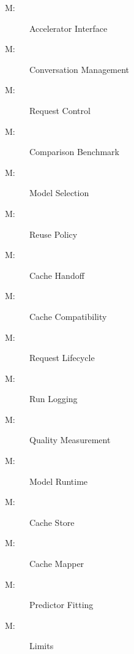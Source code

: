 \documentclass[12pt, titlepage]{article}
\newcounter{mnum}
\newcommand{\mthemnum}{M\themnum}
\begin{document}
\begin{description}
\item [ \mthemnum \label{mAccel}:] Accelerator Interface
\item [ \mthemnum \label{mConv}:] Conversation Management
\item [ \mthemnum \label{mCtrl}:] Request Control
\item [ \mthemnum \label{mBench}:] Comparison Benchmark
\item [ \mthemnum \label{mSelect}:] Model Selection
\item [ \mthemnum \label{mReuse}:] Reuse Policy
\item [ \mthemnum \label{mHandoff}:] Cache Handoff
\item [ \mthemnum \label{mCompat}:] Cache Compatibility
\item [ \mthemnum \label{mLife}:] Request Lifecycle
\item [ \mthemnum \label{mLog}:] Run Logging
\item [ \mthemnum \label{mQuality}:] Quality Measurement
\item [ \mthemnum \label{mModelRun}:] Model Runtime
\item [ \mthemnum \label{mCache}:] Cache Store
\item [ \mthemnum \label{mMap}:] Cache Mapper
\item [ \mthemnum \label{mFit}:] Predictor Fitting
\item [ \mthemnum \label{mLimits}:] Limits
\end{description}
\end{document}
